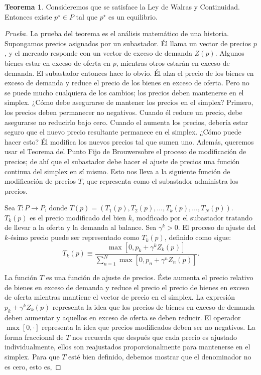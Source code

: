 \documentclass[10pt,a4paper]{article}
\theoremstyle{definition}
\newtheorem{theorem}{Teorema}[section]
\newcommand{\brouwer}{Teorema del Punto Fijo de Brouwer}
\newcommand{\walras}{Ley de Walras y Continuidad}
\newcommand{\mmax}[2]{\max\left[#1,#2\right]}
\newcommand{\gzp}[2][]{\gamma^{#2}Z_{#2}(p^{#1})}
\begin{document}
\begin{theorem}

Consideremos que se satisface la \walras. Entonces existe $p^{\star}\in P$ tal que $p^{\star}$ es un equilibrio.

\end{theorem}

\begin{proof}[Prueba]
{\color{Green}
La prueba del teorema es el análisis matemático de una historia. Supongamos precios asignados por un \linebreak subastador. Él llama un vector de precios $p$, y el mercado responde con un vector de exceso de demanda $Z(p)$. Algunos bienes estar en exceso de oferta en $p$, mientras otros estarán en exceso de demanda. El subastador entonces hace lo obvio. Él alza el precio de los bienes en exceso de demanda y reduce el precio de los bienes en exceso de oferta. Pero no se puede mucho cualquiera de los cambios; los precios deben mantenerse en el simplex. ¿Cómo debe asegurarse de mantener los precios en el simplex? Primero, los precios deben permanecer no negativos. Cuando él reduce un precio, debe asegurarse no reducirlo bajo cero. Cuando el aumenta los precios, debería estar seguro que el nuevo precio resultante permanece en el simplex. ¿Cómo puede hacer esto? Él modifica los nuevos precios tal que sumen uno. Además, queremos usar el \brouwer sobre el proceso de modificación de precios; de ahí que el subastador debe hacer el ajuste de precios una función continua del simplex en sí mismo. Esto nos lleva a la siguiente función de modificación de precios $T$, que representa como el subastador administra los precios.
}

\clearpage

Sea $T: P\rightarrow P$, donde $T(p)=\left(T_1(p),T_2(p),\ldots,T_k(p),\ldots,T_N(p)\right)$. $T_k(p)$ es el precio modificado del bien $k$, modficado por el subastador tratando de llevar a la oferta y la demanda al balance. Sea $\gamma^k>0$. El proceso de ajuste del $k$-ésimo precio puede ser representado como $T_k(p)$, definido como sigue:
\begin{equation}\label{eq:1}
T_k(p)\equiv\frac{\mmax{0}{p_k+\gzp{k}}}{\sum\limits_{n=1}^N\mmax{0}{p_n+\gzp{n}}}.
\end{equation}

La función $T$ es una función de ajuste de precios. Éste aumenta el precio relativo de bienes en exceso de demanda y reduce el precio el precio de bienes en exceso de oferta mientras mantiene el vector de precio en el simplex. La expresión $p_k+\gzp{k}$ representa la idea que los precios de bienes en exceso de demanda deben aumentar y aquellos en exceso de oferta se deben reducir. El operador $\mmax{0}{\cdot}$ representa la idea que precios modificados deben ser no \linebreak negativos. La forma fraccional de $T$ nos recuerda que después que cada precio es ajustado individualmente, ellos son reajustados proporcionalmente para mantenerse en el simplex. Para que $T$ esté bien definido, debemos mostrar que el denominador no es cero, esto es,


\end{proof}
\end{document}
